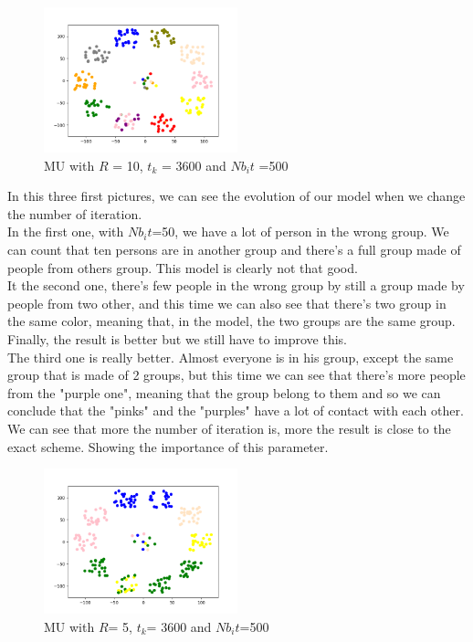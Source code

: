 \documentclass{article}
\begin{document}
\begin{figure}[h]
    \centering
    \includegraphics[width=0.5\textwidth]{images/MU500_R10_t3600.png}
    \caption{MU with $R$ = 10, $t_{k}$ = 3600 and $Nb_it$ =500}
\end{figure}

In this three first pictures, we can see the evolution of our model when we change the number of iteration.\\

In the first one, with $Nb_it$=50, we have a lot of person in the wrong group. We can count that ten persons are in another group and there's a full group made of people from others group. This model is clearly not that good.\\

It the second one, there's few people in the wrong group by still a group made by people from two other, and this time we can also see that there's two group in the same color, meaning that, in the model, the two groups are the same group. Finally, the result is better but we still have to improve this.\\

The third one is really better. Almost everyone is in his group, except the same group that is made of 2 groups, but this time we can see that there's more people from the "purple one", meaning that the group belong to them and so we can conclude that the "pinks" and the "purples" have a lot of contact with each other.\\

We can see that more the number of iteration is, more the result is close to the exact scheme. Showing the importance of this parameter.\\

\begin{figure}[h]
    \centering
    \includegraphics[width=0.5\textwidth]{images/MU500_R5_t3600.png}
    \caption{MU with $R$= 5, $t_{k}$= 3600 and $Nb_it$=500}
\end{figure}
\end{document}
